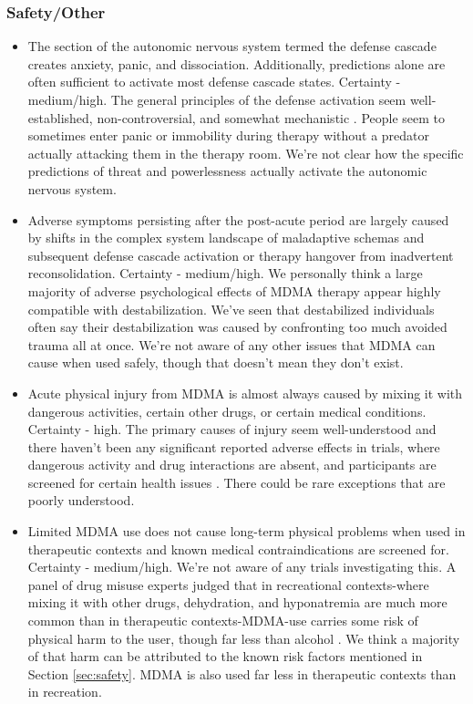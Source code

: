 \documentclass[12pt,letterpaper]{book}
\begin{document}
\subsubsection*{Safety/Other}
\begin{itemize}
	\item The section of the autonomic nervous system termed the defense cascade creates anxiety, panic, and dissociation. Additionally, predictions alone are often sufficient to activate most defense cascade states. Certainty - medium/high. The general principles of the defense activation seem well-established, non-controversial, and somewhat mechanistic \cite{kozlowskaDefenseCascade}. People seem to sometimes enter panic or immobility during therapy without a predator actually attacking them in the therapy room. We're not clear how the specific predictions of threat and powerlessness actually activate the autonomic nervous system.
	\item Adverse symptoms persisting after the post-acute period are largely caused by shifts in the complex system landscape of maladaptive schemas and subsequent defense cascade activation or therapy hangover from inadvertent reconsolidation. Certainty - medium/high. We personally think a large majority of adverse psychological effects of MDMA therapy appear highly compatible with destabilization. We've seen that destabilized individuals often say their destabilization was caused by confronting too much avoided trauma all at once. We're not aware of any other issues that MDMA can cause when used safely, though that doesn't mean they don't exist.
	\item Acute physical injury from MDMA is almost always caused by mixing it with dangerous activities, certain other drugs, or certain medical conditions. Certainty - high. The primary causes of injury seem well-understood and there haven't been any significant reported adverse effects in trials, where dangerous activity and drug interactions are absent, and participants are screened for certain health issues \textcite{wolfgang2025}. There could be rare exceptions that are poorly understood.
	\item Limited MDMA use does not cause long-term physical problems when used in therapeutic contexts and known medical contraindications are screened for. Certainty - medium/high. We're not aware of any trials investigating this. A panel of drug misuse experts judged that in recreational contexts-where mixing it with other drugs, dehydration, and hyponatremia are much more common than in therapeutic contexts-MDMA-use carries some risk of physical harm to the user, though far less than alcohol \cite{nuttDrugHarms}. We think a majority of that harm can be attributed to the known risk factors mentioned in Section \ref{sec:safety}. MDMA is also used far less in therapeutic contexts than in recreation.

\end{itemize}
\end{document}
